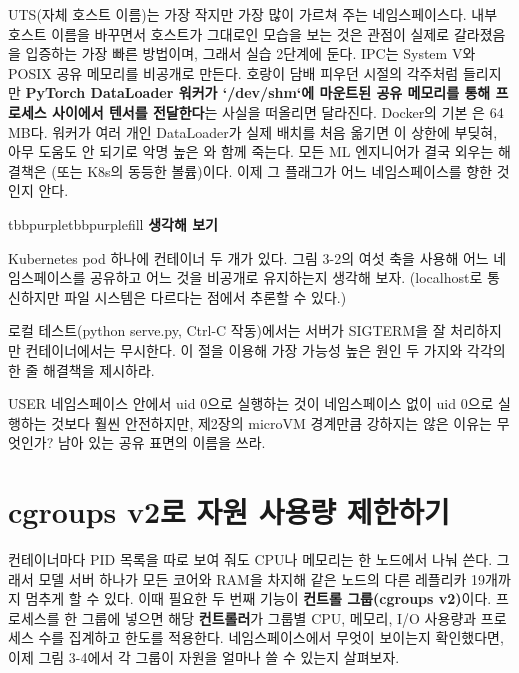 UTS(자체 호스트 이름)는 가장 작지만 가장 많이 가르쳐 주는 네임스페이스다. 내부 호스트 이름을 바꾸면서 호스트가 그대로인 모습을 보는 것은 관점이 실제로 갈라졌음을 입증하는 가장 빠른 방법이며, 그래서 실습 2단계에 둔다. IPC는 System V와 POSIX 공유 메모리를 비공개로 만든다. 호랑이 담배 피우던 시절의 각주처럼 들리지만 \textbf{PyTorch DataLoader 워커가 `/dev/shm`에 마운트된 공유 메모리를 통해 프로세스 사이에서 텐서를 전달한다}는 사실을 떠올리면 달라진다. Docker의 기본 은 64 MB다. 워커가 여러 개인 DataLoader가 실제 배치를 처음 옮기면 이 상한에 부딪혀, 아무 도움도 안 되기로 악명 높은 와 함께 죽는다. 모든 ML 엔지니어가 결국 외우는 해결책은 (또는 K8s의 동등한 볼륨)이다. 이제 그 플래그가 어느 네임스페이스를 향한 것인지 안다.

\begin{calloutbox}{tbbpurple}{tbbpurplefill}
{\normalsize\bfseries\color{tbbpurple}생각해 보기}\par\vspace{3pt}
\begin{tbbitemize}
  \item Kubernetes pod 하나에 컨테이너 두 개가 있다. 그림 3-2의 여섯 축을 사용해 어느 네임스페이스를 공유하고 어느 것을 비공개로 유지하는지 생각해 보자. (localhost로 통신하지만 파일 시스템은 다르다는 점에서 추론할 수 있다.)
  \item 로컬 테스트(python serve.py, Ctrl-C 작동)에서는 서버가 SIGTERM을 잘 처리하지만 컨테이너에서는 무시한다. 이 절을 이용해 가장 가능성 높은 원인 두 가지와 각각의 한 줄 해결책을 제시하라.
  \item USER 네임스페이스 안에서 uid 0으로 실행하는 것이 네임스페이스 없이 uid 0으로 실행하는 것보다 훨씬 안전하지만, 제2장의 microVM 경계만큼 강하지는 않은 이유는 무엇인가? 남아 있는 공유 표면의 이름을 쓰라.
\end{tbbitemize}
\end{calloutbox}

\section{cgroups v2로 자원 사용량 제한하기}

컨테이너마다 PID 목록을 따로 보여 줘도 CPU나 메모리는 한 노드에서 나눠 쓴다. 그래서 모델 서버 하나가 모든 코어와 RAM을 차지해 같은 노드의 다른 레플리카 19개까지 멈추게 할 수 있다. 이때 필요한 두 번째 기능이 \textbf{컨트롤 그룹(cgroups v2)}이다. 프로세스를 한 그룹에 넣으면 해당 \textbf{컨트롤러}가 그룹별 CPU, 메모리, I/O 사용량과 프로세스 수를 집계하고 한도를 적용한다. 네임스페이스에서 무엇이 보이는지 확인했다면, 이제 그림 3-4에서 각 그룹이 자원을 얼마나 쓸 수 있는지 살펴보자.

